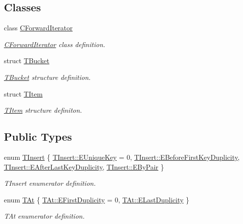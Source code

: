 \subsection*{Classes}
\begin{DoxyCompactItemize}
\item 
class \hyperlink{class_c_hash_map_1_1_c_forward_iterator}{C\+Forward\+Iterator}
\begin{DoxyCompactList}\small\item\em \hyperlink{class_c_hash_map_1_1_c_forward_iterator}{C\+Forward\+Iterator} class definition. \end{DoxyCompactList}\item 
struct \hyperlink{struct_c_hash_map_1_1_t_bucket}{T\+Bucket}
\begin{DoxyCompactList}\small\item\em \hyperlink{struct_c_hash_map_1_1_t_bucket}{T\+Bucket} structure definition. \end{DoxyCompactList}\item 
struct \hyperlink{struct_c_hash_map_1_1_t_item}{T\+Item}
\begin{DoxyCompactList}\small\item\em \hyperlink{struct_c_hash_map_1_1_t_item}{T\+Item} structure definiton. \end{DoxyCompactList}\end{DoxyCompactItemize}
\subsection*{Public Types}
\begin{DoxyCompactItemize}
\item 
enum \hyperlink{class_c_hash_map_ad4dd353df970a4464c449ef9f3b6a172}{T\+Insert} \{ \hyperlink{class_c_hash_map_ad4dd353df970a4464c449ef9f3b6a172a9823330641aba5e354b5ec054e03925d}{T\+Insert\+::\+E\+Unique\+Key} = 0, 
\hyperlink{class_c_hash_map_ad4dd353df970a4464c449ef9f3b6a172a21b083d0808068743c810401f5f3e416}{T\+Insert\+::\+E\+Before\+First\+Key\+Duplicity}, 
\hyperlink{class_c_hash_map_ad4dd353df970a4464c449ef9f3b6a172aecabac8c52e76e397328666a244c8df6}{T\+Insert\+::\+E\+After\+Last\+Key\+Duplicity}, 
\hyperlink{class_c_hash_map_ad4dd353df970a4464c449ef9f3b6a172a225fd4cd1da54b8b25b38434c9ef7078}{T\+Insert\+::\+E\+By\+Pair}
 \}\begin{DoxyCompactList}\small\item\em T\+Insert enumerator definition. \end{DoxyCompactList}
\item 
enum \hyperlink{class_c_hash_map_a9c8b9ae56d510ae0ff5e9ba74ee9930d}{T\+At} \{ \hyperlink{class_c_hash_map_a9c8b9ae56d510ae0ff5e9ba74ee9930da583fa6e6852d051c6e7f4b63cad9991f}{T\+At\+::\+E\+First\+Duplicity} = 0, 
\hyperlink{class_c_hash_map_a9c8b9ae56d510ae0ff5e9ba74ee9930da25f8a9e347bc7a066cf16ab19d17d12b}{T\+At\+::\+E\+Last\+Duplicity}
 \}\begin{DoxyCompactList}\small\item\em T\+At enumerator definition. \end{DoxyCompactList}
\end{DoxyCompactItemize}
